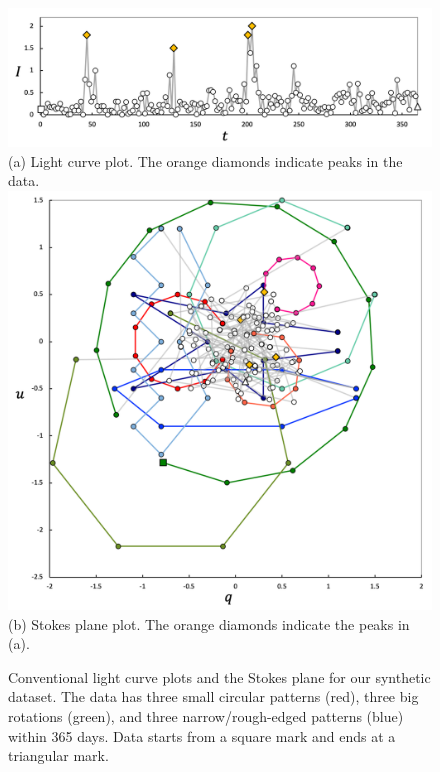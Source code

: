 \begin{figure}[t]
    \centering
    \vspace{3mm}
    \includegraphics[width=.8\linewidth]{vgtc_journal_latex/figures/synthesisDataLightCurveLabel_revised.png}\\
    \footnotesize{\sf (a) Light curve plot. The orange diamonds indicate peaks in the data.}\\
    \includegraphics[width=.83\linewidth]{vgtc_journal_latex/figures/synthesisDataStokesLabel_revised.png}\\
    \footnotesize{\sf (b) Stokes plane plot. The orange diamonds indicate the peaks in (a).}
    \caption{Conventional light curve plots and the Stokes plane for our synthetic dataset. The data has three small circular patterns (red), three big rotations (green), and three narrow/rough-edged patterns (blue) within 365 days. Data starts from a square mark and ends at a triangular mark.}
    \label{fig:synthesisData}
\end{figure}






